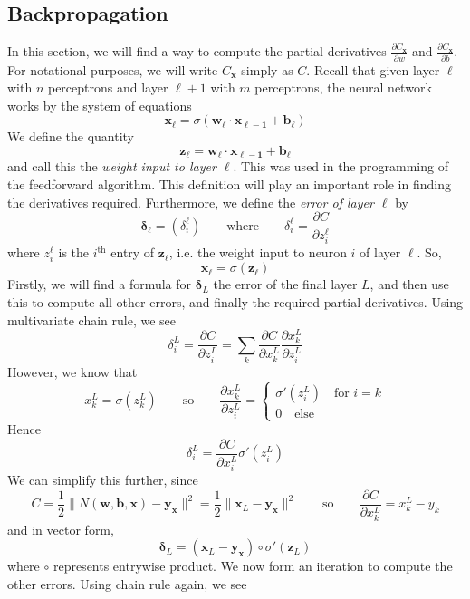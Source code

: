 \documentclass[10pt]{article}
\begin{document}
\subsection{Backpropagation}
In this section, we will find a way to compute the partial derivatives $\frac{\partial C_{\mathbf{x}}}{\partial w}$ and $\frac{\partial C_{\mathbf{x}}}{\partial b}$. For notational purposes, we will write $C_{\mathbf{x}}$ simply as $C$.
Recall that given layer $\ell$ with $n$ perceptrons and layer $\ell+1$ with $m$ perceptrons, the neural network works by the system of equations
\[
\mathbf{x}_{\ell} = \sigma\left(\mathbf{w}_{\ell} \cdot \mathbf{x_{\ell - 1}} + \mathbf{b}_{\ell} \right)
\]
We define the quantity
\[
\mathbf{z}_{\ell} = \mathbf{w}_{\ell} \cdot \mathbf{x_{\ell - 1}} + \mathbf{b}_{\ell}
\]
and call this the \textit{weight input to layer $\ell$}. This was used in the programming of the feedforward algorithm. This definition will play an important role in finding the derivatives required. Furthermore, we define the \textit{error of layer $\ell$} by
\[
\boldsymbol{\delta}_{\ell} = \left( \delta^{\ell}_i \right) \qquad \text{where} \qquad \delta^{\ell}_i = \frac{\partial C}{\partial z^{\ell}_i}
\]
where $z^{\ell}_i$ is the $i^{\text{th}}$ entry of $\mathbf{z}_{\ell}$, i.e. the weight input to neuron $i$ of layer $\ell$. So, 
\[
\mathbf{x}_{\ell} = \sigma\left(\mathbf{z}_{\ell} \right)
\]
Firstly, we will find a formula for $\boldsymbol{\delta}_L$ the error of the final layer $L$, and then use this to compute all other errors, and finally the required partial derivatives. Using multivariate chain rule, we see
\[
\delta^{L}_i = \frac{\partial C}{\partial z^{L}_i} = \sum_{k} \frac{\partial C}{\partial x^{L}_k} \frac{\partial x^{L}_k}{\partial z^{L}_i}
\]
However, we know that
\[
x^{L}_k = \sigma\left(z^{L}_k\right) \qquad \text{so} \qquad \frac{\partial x^{L}_k}{\partial z^{L}_i} = \begin{cases}
\sigma'\left(z^{L}_i\right) \quad \text{for } i=k\\
0 \quad \text{else}
\end{cases}
\]
Hence
\[
\delta^{L}_i = \frac{\partial C}{\partial x^{L}_i} \sigma'\left(z^{L}_i\right)
\]
We can simplify this further, since
\[
C = \frac{1}{2}\lVert N(\mathbf{w},\mathbf{b},\mathbf{x}) - \mathbf{y_x}\rVert ^2 = \frac{1}{2}\lVert \mathbf{x}_{L} - \mathbf{y_x}\rVert ^2
\qquad
\text{so}
\qquad
\frac{\partial C}{\partial x^{L}_k} = x^{L}_k - y_{k}
\]
and in vector form,
\[
\boldsymbol{\delta}_L = (\mathbf{x}_{L} - \mathbf{y_x}) \circ \sigma'(\mathbf{z}_L)
\]
where $\circ$ represents entrywise product. We now form an iteration to compute the other errors. Using chain rule again, we see
\end{document}
